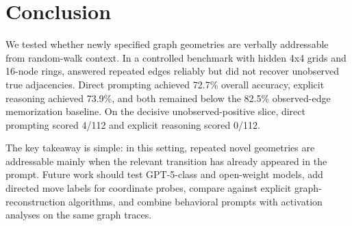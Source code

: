 \section{Conclusion}
\label{sec:conclusion}

We tested whether newly specified graph geometries are verbally addressable from random-walk context. In a controlled benchmark with hidden 4x4 grids and 16-node rings, \gptfourone answered repeated edges reliably but did not recover unobserved true adjacencies. Direct prompting achieved 72.7\% overall accuracy, explicit reasoning achieved 73.9\%, and both remained below the 82.5\% observed-edge memorization baseline. On the decisive unobserved-positive slice, direct prompting scored 4/112 and explicit reasoning scored 0/112.

The key takeaway is simple: in this setting, repeated novel geometries are addressable mainly when the relevant transition has already appeared in the prompt. Future work should test GPT-5-class and open-weight models, add directed move labels for coordinate probes, compare against explicit graph-reconstruction algorithms, and combine behavioral prompts with activation analyses on the same graph traces.
